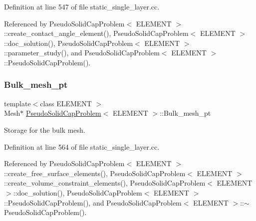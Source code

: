 Definition at line 547 of file static\+\_\+single\+\_\+layer.\+cc.



Referenced by Pseudo\+Solid\+Cap\+Problem$<$ E\+L\+E\+M\+E\+N\+T $>$\+::create\+\_\+contact\+\_\+angle\+\_\+element(), Pseudo\+Solid\+Cap\+Problem$<$ E\+L\+E\+M\+E\+N\+T $>$\+::doc\+\_\+solution(), Pseudo\+Solid\+Cap\+Problem$<$ E\+L\+E\+M\+E\+N\+T $>$\+::parameter\+\_\+study(), and Pseudo\+Solid\+Cap\+Problem$<$ E\+L\+E\+M\+E\+N\+T $>$\+::\+Pseudo\+Solid\+Cap\+Problem().

\mbox{\label{classPseudoSolidCapProblem_a6d4520b30d05f3dde12ea9bae9d62d0b}} 
\subsubsection{\texorpdfstring{Bulk\+\_\+mesh\+\_\+pt}{Bulk\_mesh\_pt}\hspace{0.1cm}{\footnotesize\ttfamily [1/2]}}
{\footnotesize\ttfamily template$<$class E\+L\+E\+M\+E\+NT $>$ \\
Mesh$\ast$ \hyperlink{classPseudoSolidCapProblem}{Pseudo\+Solid\+Cap\+Problem}$<$ E\+L\+E\+M\+E\+NT $>$\+::Bulk\+\_\+mesh\+\_\+pt\hspace{0.3cm}{\ttfamily [private]}}



Storage for the bulk mesh. 



Definition at line 564 of file static\+\_\+single\+\_\+layer.\+cc.



Referenced by Pseudo\+Solid\+Cap\+Problem$<$ E\+L\+E\+M\+E\+N\+T $>$\+::create\+\_\+free\+\_\+surface\+\_\+elements(), Pseudo\+Solid\+Cap\+Problem$<$ E\+L\+E\+M\+E\+N\+T $>$\+::create\+\_\+volume\+\_\+constraint\+\_\+elements(), Pseudo\+Solid\+Cap\+Problem$<$ E\+L\+E\+M\+E\+N\+T $>$\+::doc\+\_\+solution(), Pseudo\+Solid\+Cap\+Problem$<$ E\+L\+E\+M\+E\+N\+T $>$\+::\+Pseudo\+Solid\+Cap\+Problem(), and Pseudo\+Solid\+Cap\+Problem$<$ E\+L\+E\+M\+E\+N\+T $>$\+::$\sim$\+Pseudo\+Solid\+Cap\+Problem().

\mbox{\label{classPseudoSolidCapProblem_a24ee2e5afd19ab0febf85306d45c8385}} 
